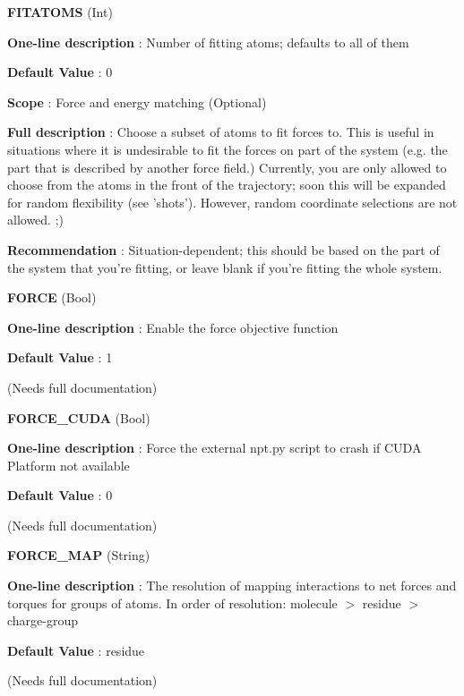 \begin{DoxyItemize}
\item {\bfseries  F\-I\-T\-A\-T\-O\-M\-S } (Int) \par
{\bfseries  One-\/line description }\-: Number of fitting atoms; defaults to all of them \par
{\bfseries  Default Value }\-: 0 \par
{\bfseries  Scope }\-: Force and energy matching (Optional) \par
{\bfseries  Full description }\-: Choose a subset of atoms to fit forces to. This is useful in situations where it is undesirable to fit the forces on part of the system (e.\-g. the part that is described by another force field.) Currently, you are only allowed to choose from the atoms in the front of the trajectory; soon this will be expanded for random flexibility (see 'shots'). However, random coordinate selections are not allowed. ;) \par
{\bfseries  Recommendation }\-: Situation-\/dependent; this should be based on the part of the system that you're fitting, or leave blank if you're fitting the whole system.\end{DoxyItemize}
\begin{DoxyItemize}
\item {\bfseries  F\-O\-R\-C\-E } (Bool) \par
{\bfseries  One-\/line description }\-: Enable the force objective function \par
{\bfseries  Default Value }\-: 1 \par
(Needs full documentation)\end{DoxyItemize}
\begin{DoxyItemize}
\item {\bfseries  F\-O\-R\-C\-E\-\_\-\-C\-U\-D\-A } (Bool) \par
{\bfseries  One-\/line description }\-: Force the external npt.\-py script to crash if C\-U\-D\-A Platform not available \par
{\bfseries  Default Value }\-: 0 \par
(Needs full documentation)\end{DoxyItemize}
\begin{DoxyItemize}
\item {\bfseries  F\-O\-R\-C\-E\-\_\-\-M\-A\-P } (String) \par
{\bfseries  One-\/line description }\-: The resolution of mapping interactions to net forces and torques for groups of atoms. In order of resolution\-: molecule $>$ residue $>$ charge-\/group \par
{\bfseries  Default Value }\-: residue \par
(Needs full documentation)\end{DoxyItemize}
